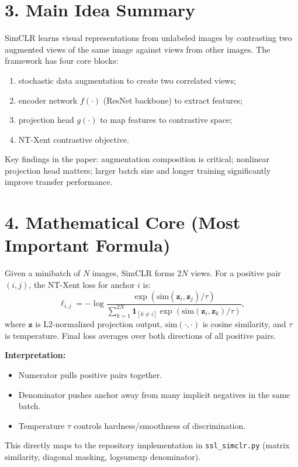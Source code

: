 \documentclass[11pt,a4paper]{article}
\begin{document}
\section*{3. Main Idea Summary}
SimCLR learns visual representations from unlabeled images by contrasting two augmented views of the same image against views from other images. The framework has four core blocks:
\begin{enumerate}[leftmargin=1.5em]
    \item stochastic data augmentation to create two correlated views;
    \item encoder network $f(\cdot)$ (ResNet backbone) to extract features;
    \item projection head $g(\cdot)$ to map features to contrastive space;
    \item NT-Xent contrastive objective.
\end{enumerate}
Key findings in the paper: augmentation composition is critical; nonlinear projection head matters; larger batch size and longer training significantly improve transfer performance.

\section*{4. Mathematical Core (Most Important Formula)}
Given a minibatch of $N$ images, SimCLR forms $2N$ views. For a positive pair $(i,j)$, the NT-Xent loss for anchor $i$ is:
\begin{equation}
\ell_{i,j} = -\log
\frac{
\exp\left(\mathrm{sim}(\mathbf{z}_i,\mathbf{z}_j)/\tau\right)
}{
\sum\limits_{k=1}^{2N}\mathbf{1}_{[k\neq i]}\exp\left(\mathrm{sim}(\mathbf{z}_i,\mathbf{z}_k)/\tau\right)
},
\end{equation}
where $\mathbf{z}$ is L2-normalized projection output, $\mathrm{sim}(\cdot,\cdot)$ is cosine similarity, and $\tau$ is temperature. Final loss averages over both directions of all positive pairs.

\textbf{Interpretation:}
\begin{itemize}[leftmargin=1.5em]
    \item Numerator pulls positive pairs together.
    \item Denominator pushes anchor away from many implicit negatives in the same batch.
    \item Temperature $\tau$ controls hardness/smoothness of discrimination.
\end{itemize}
This directly maps to the repository implementation in \texttt{ssl\_simclr.py} (matrix similarity, diagonal masking, logsumexp denominator).
\end{document}
